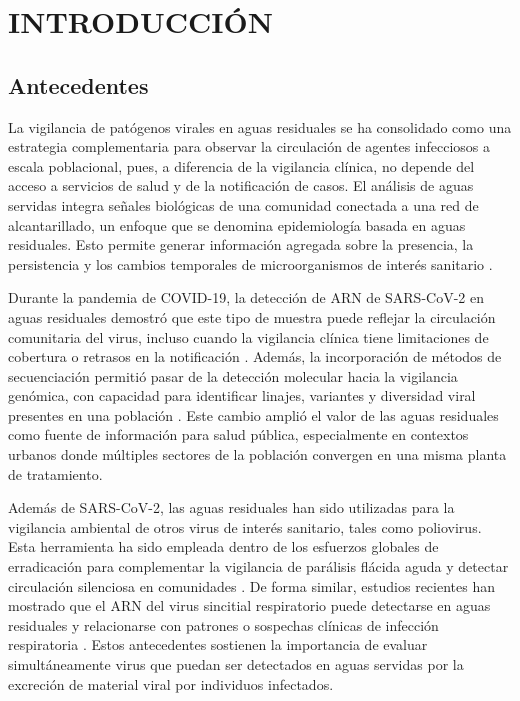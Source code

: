 \section{INTRODUCCIÓN}

\subsection{Antecedentes}

La vigilancia de patógenos virales en aguas residuales se ha consolidado como una estrategia complementaria para observar la circulación de agentes infecciosos a escala poblacional, pues, a diferencia de la vigilancia clínica, no depende del acceso a servicios de salud y de la notificación de casos. El análisis de aguas servidas integra señales biológicas de una comunidad conectada a una red de alcantarillado, un enfoque que se denomina epidemiología basada en aguas residuales. Esto permite generar información agregada sobre la presencia, la persistencia y los cambios temporales de microorganismos de interés sanitario \cite{Sims_2020}.

Durante la pandemia de COVID-19, la detección de ARN de SARS-CoV-2 en aguas residuales demostró que este tipo de muestra puede reflejar la circulación comunitaria del virus, incluso cuando la vigilancia clínica tiene limitaciones de cobertura o retrasos en la notificación \cite{Ahmed_2020,Medema_2020}. Además, la incorporación de métodos de secuenciación permitió pasar de la detección molecular hacia la vigilancia genómica, con capacidad para identificar linajes, variantes y diversidad viral presentes en una población \cite{Crits_Christoph_2021}. Este cambio amplió el valor de las aguas residuales como fuente de información para salud pública, especialmente en contextos urbanos donde múltiples sectores de la población convergen en una misma planta de tratamiento.

Además de SARS-CoV-2, las aguas residuales han sido utilizadas para la vigilancia ambiental de otros virus de interés sanitario, tales como poliovirus. Esta herramienta ha sido empleada dentro de los esfuerzos globales de erradicación para complementar la vigilancia de parálisis flácida aguda y detectar circulación silenciosa en comunidades \cite{Asghar_2014}. De forma similar, estudios recientes han mostrado que el ARN del virus sincitial respiratorio puede detectarse en aguas residuales y relacionarse con patrones o sospechas clínicas de infección respiratoria \cite{Hughes_2022}. Estos antecedentes sostienen la importancia de evaluar simultáneamente virus que puedan ser detectados en aguas servidas por la excreción de material viral por individuos infectados.

